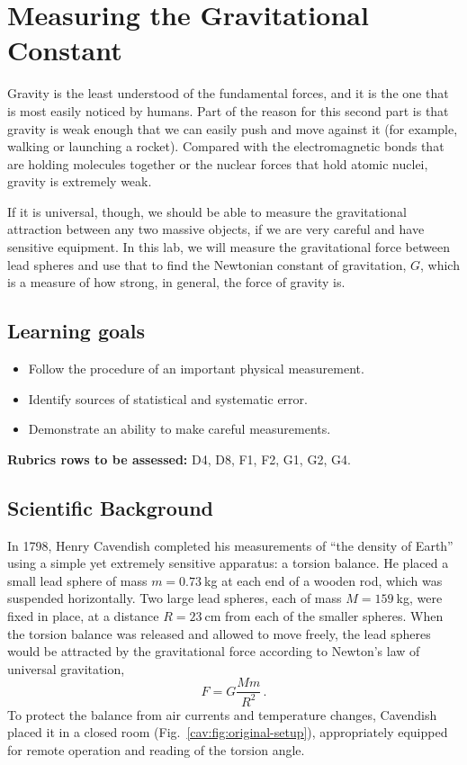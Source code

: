 \chapter{Measuring the Gravitational Constant}

Gravity is the least understood of the fundamental forces, and it is the one that is most easily noticed by humans. Part of the reason for this second part is that gravity is weak enough that we can easily push and move against it (for example, walking or launching a rocket). Compared with the electromagnetic bonds that are holding molecules together or the nuclear forces that hold atomic nuclei, gravity is extremely weak.

If it is universal, though, we should be able to measure the gravitational attraction between any two massive objects, if we are very careful and have sensitive equipment. In this lab, we will measure the gravitational force between lead spheres and use that to find the Newtonian constant of gravitation, $G$, which is a measure of how strong, in general, the force of gravity is.

\section{Learning goals}

\begin{itemize}
	\item Follow the procedure of an important physical measurement.
	
	\item Identify sources of statistical and systematic error.
	
	\item Demonstrate an ability to make careful measurements.
\end{itemize}

\textbf{Rubrics rows to be assessed:} D4, D8, F1, F2, G1, G2, G4.

\section{Scientific Background}

In 1798, Henry Cavendish completed his measurements of ``the density of Earth'' using a
simple yet extremely sensitive apparatus: a torsion balance. He placed a small lead sphere
of mass $m = 0.73\:$kg at each end of a wooden rod, which was suspended horizontally.
Two large lead spheres, each of mass $M = 159\:$kg, were fixed in place, at a distance $R =
23\:$cm from each of the smaller spheres. When the torsion balance was released and
allowed to move freely, the lead spheres would be attracted by the gravitational force according to Newton's law of universal gravitation,
\begin{equation}\label{cav:eq:newtons-grav}
 F = G \frac{M m}{R^2} \,.
\end{equation}
To protect the balance from air currents and temperature changes, Cavendish placed it in
a closed room (Fig.~\ref{cav:fig:original-setup}), appropriately equipped for remote operation and reading of the
torsion angle.


